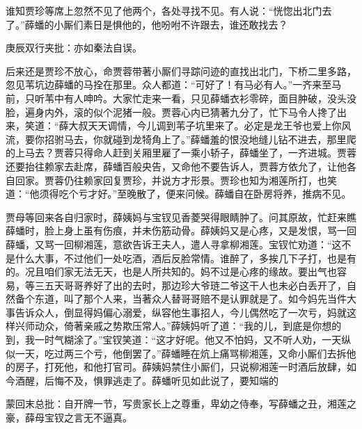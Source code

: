 \begin{parag}
    谁知贾珍等席上忽然不见了他两个，各处寻找不见。有人说：“恍惚出北门去了。”薛蟠的小厮们素日是惧他的，他吩咐不许跟去，谁还敢找去？\begin{note}庚辰双行夹批：亦如秦法自误。\end{note}后来还是贾珍不放心，命贾蓉带著小厮们寻踪问迹的直找出北门，下桥二里多路，忽见苇坑边薛蟠的马拴在那里。众人都道：“可好了！有马必有人。”一齐来至马前，只听苇中有人呻吟。大家忙走来一看，只见薛蟠衣衫零碎，面目肿破，没头没脸，遍身内外，滚的似个泥猪一般。贾蓉心内已猜著九分了，忙下马令人搀了出来，笑道：“薛大叔天天调情，今儿调到苇子坑里来了。必定是龙王爷也爱上你风流，要你招驸马去，你就碰到龙犄角上了。”薛蟠羞的恨没地缝儿钻不进去，那里爬的上马去？贾蓉只得命人赶到关厢里雇了一乘小轿子，薛蟠坐了，一齐进城。贾蓉还要抬往赖家去赴席，薛蟠百般央告，又命他不要告诉人，贾蓉方依允了，让他各自回家。贾蓉仍往赖家回复贾珍，并说方才形景。贾珍也知为湘莲所打，也笑道：“他须得吃个亏才好。”至晚散了，便来问候。薛蟠自在卧房将养，推病不见。
\end{parag}


\begin{parag}
    贾母等回来各自归家时，薛姨妈与宝钗见香菱哭得眼睛肿了。问其原故，忙赶来瞧薛蟠时，脸上身上虽有伤痕，并未伤筋动骨。薛姨妈又是心疼，又是发恨，骂一回薛蟠，又骂一回柳湘莲，意欲告诉王夫人，遣人寻拿柳湘莲。宝钗忙劝道：“这不是什么大事，不过他们一处吃酒，酒后反脸常情。谁醉了，多挨几下子打，也是有的。况且咱们家无法无天，也是人所共知的。妈不过是心疼的缘故。要出气也容易，等三五天哥哥养好了出的去时，那边珍大爷琏二爷这干人也未必白丢开了，自然备个东道，叫了那个人来，当著众人替哥哥赔不是认罪就是了。如今妈先当件大事告诉众人，倒显得妈偏心溺爱，纵容他生事招人，今儿偶然吃了一次亏，妈就这样兴师动众，倚著亲戚之势欺压常人。”薛姨妈听了道：“我的儿，到底是你想的到，我一时气糊涂了。”宝钗笑道：“这才好呢。他又不怕妈，又不听人劝，一天纵似一天，吃过两三个亏，他倒罢了。”薛蟠睡在炕上痛骂柳湘莲，又命小厮们去拆他的房子，打死他，和他打官司。薛姨妈禁住小厮们，只说柳湘莲一时酒后放肆，如今酒醒，后悔不及，惧罪逃走了。薛蟠听见如此说了，要知端的
\end{parag}


\begin{parag}
    \begin{note}蒙回末总批：自开牌一节，写贵家长上之尊重，卑幼之侍奉，写薛蟠之丑，湘莲之豪，薛母宝钗之言无不逼真。\end{note}
\end{parag}


